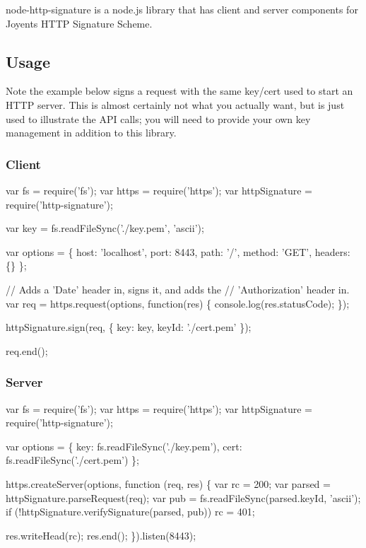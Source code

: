 node-\/http-\/signature is a node.\+js library that has client and server components for Joyent\textquotesingle{}s H\+T\+T\+P Signature Scheme.

\subsection*{Usage}

Note the example below signs a request with the same key/cert used to start an H\+T\+T\+P server. This is almost certainly not what you actually want, but is just used to illustrate the A\+P\+I calls; you will need to provide your own key management in addition to this library.

\subsubsection*{Client}


\begin{DoxyCode}
var fs = require(\textcolor{stringliteral}{'fs'});
var https = require(\textcolor{stringliteral}{'https'});
var httpSignature = require(\textcolor{stringliteral}{'http-signature'});

var key = fs.readFileSync(\textcolor{stringliteral}{'./key.pem'}, \textcolor{stringliteral}{'ascii'});

var options = \{
  host: \textcolor{stringliteral}{'localhost'},
  port: 8443,
  path: \textcolor{charliteral}{'/'},
  method: \textcolor{stringliteral}{'GET'},
  headers: \{\}
\};

\textcolor{comment}{// Adds a 'Date' header in, signs it, and adds the}
\textcolor{comment}{// 'Authorization' header in.}
var req = https.request(options, \textcolor{keyword}{function}(res) \{
  console.log(res.statusCode);
\});


httpSignature.sign(req, \{
  key: key,
  keyId: \textcolor{stringliteral}{'./cert.pem'}
\});

req.end();
\end{DoxyCode}


\subsubsection*{Server}


\begin{DoxyCode}
var fs = require(\textcolor{stringliteral}{'fs'});
var https = require(\textcolor{stringliteral}{'https'});
var httpSignature = require(\textcolor{stringliteral}{'http-signature'});

var options = \{
  key: fs.readFileSync(\textcolor{stringliteral}{'./key.pem'}),
  cert: fs.readFileSync(\textcolor{stringliteral}{'./cert.pem'})
\};

https.createServer(options, \textcolor{keyword}{function} (req, res) \{
  var rc = 200;
  var parsed = httpSignature.parseRequest(req);
  var pub = fs.readFileSync(parsed.keyId, \textcolor{stringliteral}{'ascii'});
  \textcolor{keywordflow}{if} (!httpSignature.verifySignature(parsed, pub))
    rc = 401;

  res.writeHead(rc);
  res.end();
\}).listen(8443);
\end{DoxyCode}


